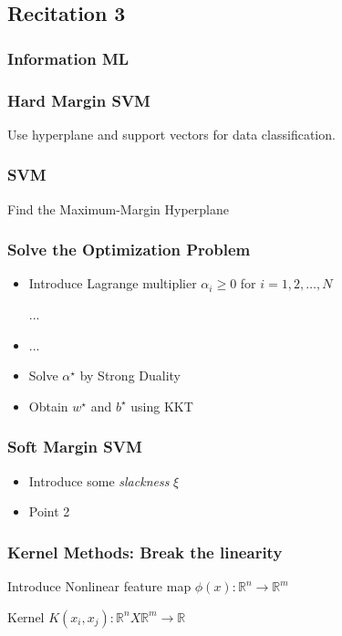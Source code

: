 \subsection {Recitation 3}

\subsubsection{Information ML}

\subsubsection{Hard Margin SVM}

Use hyperplane  and support vectors for data classification.

\subsubsection{SVM}
Find the Maximum-Margin Hyperplane

\subsubsection{Solve the Optimization Problem}
\begin{itemize}
	\item Introduce Lagrange multiplier $\alpha_i \ge 0$ for $i=1,2,\dots,N$

	      ...

	\item ...
	\item  Solve  $\alpha^\star$ by Strong Duality
	\item Obtain $w^{\star}$ and $b^{\star}$ using KKT

\end{itemize}

\subsubsection{Soft Margin SVM}
\begin{itemize}
	\item Introduce some \textit{slackness} $\xi$
	\item Point 2
\end{itemize}

\subsubsection{Kernel Methods: Break the linearity}
Introduce  Nonlinear feature map $\phi(x): \mathbb{R}^{n}\rightarrow \mathbb{R}^{m}$

Kernel $K(x_i,x_j): \mathbb{R}^{n} X \mathbb{R}^{m}\rightarrow \mathbb{R}$


